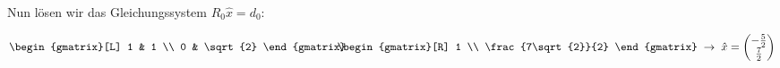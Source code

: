 \begin{solution}
    Nun lösen wir das Gleichungssystem \( R_0 \hat{x} = d_0 \):

    \begin{equation*}
        \begin{gmatrix}[L]
            1 & 1 \\
            0 & \sqrt{2}
        \end{gmatrix} \hspace{-0.75em} \begin{gmatrix}[R]
            1 \\ \frac{7\sqrt{2}}{2}
        \end{gmatrix} \; \rightarrow \; \hat{x} = \begin{pmatrix}
            -\frac{5}{2} \\
            \frac{7}{2}
        \end{pmatrix} 
    \end{equation*}

\end{solution}
